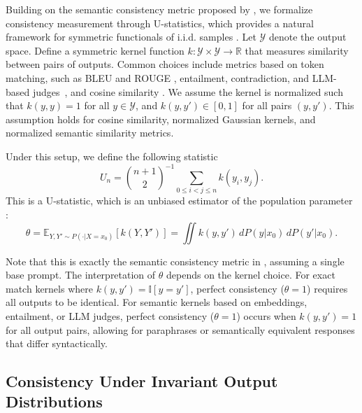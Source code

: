 \documentclass{article}
\theoremstyle{plain}
\theoremstyle{definition}
\theoremstyle{remark}
\begin{document}
Building on the semantic consistency metric proposed by \cite{raj2023measuringreliabilitylargelanguage}, we formalize consistency measurement through U-statistics, which provides a natural framework for symmetric functionals of i.i.d. samples \cite{lee1990ustatistics}. Let $\mathcal{Y}$ denote the output space. Define a symmetric kernel function $k: \mathcal{Y} \times \mathcal{Y} \rightarrow \mathbb{R}$ that measures similarity between pairs of outputs. Common choices include metrics based on token matching, such as BLEU and ROUGE \cite{elazar_measuring_2021}, entailment, contradiction, and LLM-based judges~\cite{raj2023measuringreliabilitylargelanguage}, and cosine similarity \cite{rabinovich-etal-2023-predicting}. We assume the kernel is normalized such that $k(y, y) = 1$ for all $y \in \mathcal{Y}$, and $k(y, y') \in [0, 1]$ for all pairs $(y, y')$. This assumption holds for cosine similarity, normalized Gaussian kernels, and normalized semantic similarity metrics. %

Under this setup, we define the following statistic 
%
\begin{equation}
    U_n = \binom{n+1}{2}^{-1} \sum_{0 \leq i < j \leq n} k(y_i, y_j).
    \label{eq:u_statistic}
\end{equation}
%
This is a U-statistic, which is an unbiased estimator of the population parameter \cite{lee1990ustatistics}:
\begin{equation}
    \theta = \mathbb E_{Y, Y' \sim P(\cdot|X=x_0)}[k(Y, Y')] = \iint k(y, y') \, dP(y|x_0) \, dP(y'|x_0).
    \label{eq:theta}
\end{equation}

Note that this is exactly the semantic consistency metric in \cite{raj2023measuringreliabilitylargelanguage}, assuming a single base prompt. The interpretation of $\theta$ depends on the kernel choice. For exact match kernels where $k(y, y') = \mathbb{I}[y = y']$, perfect consistency ($\theta = 1$) requires all outputs to be identical. For semantic kernels based on embeddings, entailment, or LLM judges, perfect consistency ($\theta = 1$) occurs when $k(y, y') = 1$ for all output pairs, allowing for paraphrases or semantically equivalent responses that differ syntactically.

\subsection{Consistency Under Invariant Output Distributions}
\end{document}
